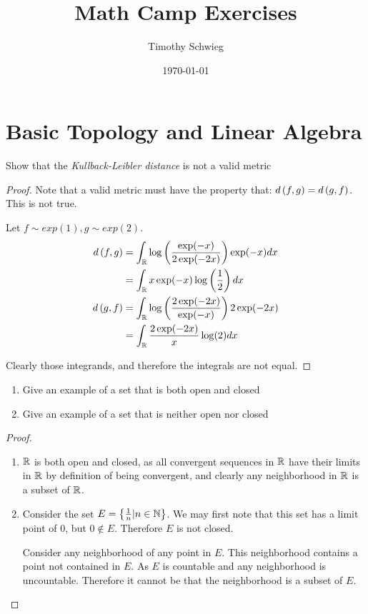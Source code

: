 \documentclass[12pt, letterpaper]{paper}
\author{Timothy Schwieg}
\date{\today}
\title{Math Camp Exercises}
\begin{document}
\maketitle

\section{Basic Topology and Linear Algebra}


\begin{question}
  Show that the \emph{Kullback-Leibler distance} is not a valid metric

  \begin{proof}
    Note that a valid metric must have the property that: $d \left ( f,g \right ) =
    d \left ( g,f \right )$. This is not true.

    Let $f \sim exp(1), g \sim exp(2)$. 
    \begin{align*}
      d \left ( f,g \right ) &= \int_{\mathbb{R}} \log \left ( \frac{ \exp (  -x )}{ 2 \exp ( -2x  )} \right ) \exp (  -x ) dx\\
                &= \int_{\mathbb{R}} x \exp (  -x ) \log \left ( \frac{1}{2} \right ) dx\\
      d \left ( g,f \right ) &= \int_{\mathbb{R}} \log \left ( \frac{2 \exp ( -2x )}{\exp ( -x )}
                  \right ) 2 \exp (  -2x  )\\
                &= \int_{\mathbb{R}} \frac{2 \exp ( -2x )}{x} \log ( 2 ) dx\\      
    \end{align*}

    Clearly those integrands, and therefore the integrals are not equal.
  \end{proof}
\end{question}

\begin{question}
  \begin{enumerate}
  \item Give an example of a set that is both open and closed
  \item Give an example of a set that is neither open nor closed
  \end{enumerate}

  \begin{proof}
    \begin{enumerate}
    \item $\mathbb{R}$ is both open and closed, as all convergent sequences
      in $\mathbb{R}$ have their limits in $\mathbb{R}$ by definition of being
      convergent, and clearly any neighborhood in $\mathbb{R}$ is a subset
      of $\mathbb{R}$.
    \item Consider the set $E = \left \{  \frac{1}{n} | n \in \mathbb{N} \right \}$. We may
      first note that this set has a limit point of $0$, but $0 \notin
      E$. Therefore $E$ is not closed.

      Consider any neighborhood of any point in $E$. This neighborhood
      contains a point not contained in $E$. As $E$ is countable and
      any neighborhood is uncountable. Therefore it cannot be that the
      neighborhood is a subset of $E$.
    \end{enumerate}
  \end{proof}
\end{question}
\end{document}
